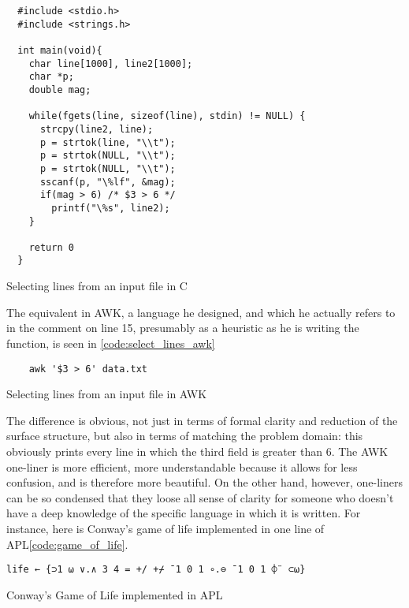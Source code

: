\pagebreak
\begin{listing}
  \begin{verbatim} 
  #include <stdio.h>
  #include <strings.h>

  int main(void){
    char line[1000], line2[1000];
    char *p;
    double mag;

    while(fgets(line, sizeof(line), stdin) != NULL) {
      strcpy(line2, line);
      p = strtok(line, "\\t");
      p = strtok(NULL, "\\t");
      p = strtok(NULL, "\\t");
      sscanf(p, "\%lf", &mag);
      if(mag > 6) /* $3 > 6 */
        printf("\%s", line2); 
    }

    return 0
  }
\end{verbatim}
  \caption{Selecting lines from an input file in C}
  \label{code:select_lines_c}
\end{listing}

The equivalent in AWK, a language he designed, and which he actually refers to in the comment on line 15, presumably as a heuristic as he is writing the function, is seen in \ref{code:select_lines_awk}

\begin{listing}
  \begin{verbatim}
    awk '$3 > 6' data.txt
  \end{verbatim}
  \caption{Selecting lines from an input file in AWK}
  \label{code:select_lines_awk}
\end{listing}

The difference is obvious, not just in terms of formal clarity and reduction of the surface structure, but also in terms of matching the problem domain: this obviously prints every line in which the third field is greater than 6. The AWK one-liner is more efficient, more understandable because it allows for less confusion, and is therefore more beautiful. On the other hand, however, one-liners can be so condensed that they loose all sense of clarity for someone who doesn't have a deep knowledge of the specific language in which it is written. For instance, here is Conway's game of life implemented in one line of APL\ref{code:game_of_life}.

\begin{listing}
  \begin{verbatim}
life ← {⊃1 ⍵ ∨.∧ 3 4 = +/ +⌿ ¯1 0 1 ∘.⊖ ¯1 0 1 ⌽¨ ⊂⍵}
\end{verbatim}
  \caption{Conway's Game of Life implemented in APL}
  \label{code:game_of_life}
\end{listing}

